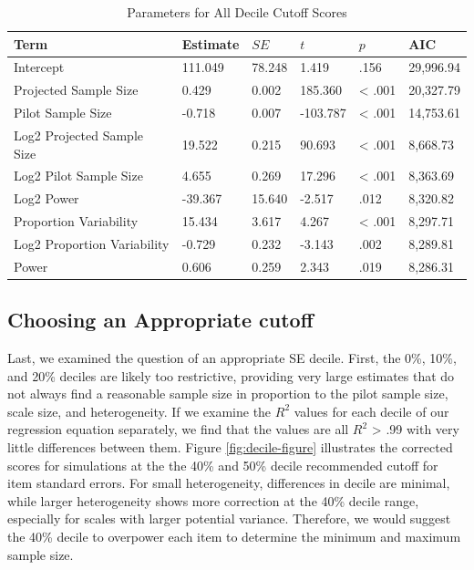 \documentclass[
  man]{apa7}
\begin{document}
\begin{table}[tbp]

\begin{center}
\begin{threeparttable}

\caption{\label{tab:table-correction}Parameters for All Decile Cutoff Scores}

\begin{tabular}{llllll}
\toprule
Term & Estimate & $SE$ & $t$ & $p$ & AIC\\
\midrule
Intercept & 111.049 & 78.248 & 1.419 & .156 & 29,996.94\\
Projected Sample Size & 0.429 & 0.002 & 185.360 & < .001 & 20,327.79\\
Pilot Sample Size & -0.718 & 0.007 & -103.787 & < .001 & 14,753.61\\
Log2 Projected Sample Size & 19.522 & 0.215 & 90.693 & < .001 & 8,668.73\\
Log2 Pilot Sample Size & 4.655 & 0.269 & 17.296 & < .001 & 8,363.69\\
Log2 Power & -39.367 & 15.640 & -2.517 & .012 & 8,320.82\\
Proportion Variability & 15.434 & 3.617 & 4.267 & < .001 & 8,297.71\\
Log2 Proportion Variability & -0.729 & 0.232 & -3.143 & .002 & 8,289.81\\
Power & 0.606 & 0.259 & 2.343 & .019 & 8,286.31\\
\bottomrule
\end{tabular}

\end{threeparttable}
\end{center}

\end{table}

\hypertarget{choosing-an-appropriate-cutoff}{%
\subsection{Choosing an Appropriate cutoff}\label{choosing-an-appropriate-cutoff}}

Last, we examined the question of an appropriate SE decile. First, the 0\%, 10\%, and 20\% deciles are likely too restrictive, providing very large estimates that do not always find a reasonable sample size in proportion to the pilot sample size, scale size, and heterogeneity. If we examine the \(R^2\) values for each decile of our regression equation separately, we find that the values are all \(R^2\) \textgreater{} .99 with very little differences between them. Figure \ref{fig:decile-figure} illustrates the corrected scores for simulations at the the 40\% and 50\% decile recommended cutoff for item standard errors. For small heterogeneity, differences in decile are minimal, while larger heterogeneity shows more correction at the 40\% decile range, especially for scales with larger potential variance. Therefore, we would suggest the 40\% decile to overpower each item to determine the minimum and maximum sample size.
\end{document}
